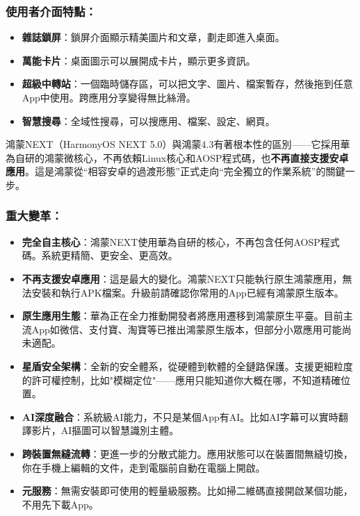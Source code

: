 \subsubsection*{使用者介面特點：}

\begin{itemize}
  \item \textbf{雜誌鎖屏}：鎖屏介面顯示精美圖片和文章，劃走即進入桌面。
  \item \textbf{萬能卡片}：桌面圖示可以展開成卡片，顯示更多資訊。
  \item \textbf{超級中轉站}：一個臨時儲存區，可以把文字、圖片、檔案暫存，然後拖到任意App中使用。跨應用分享變得無比絲滑。
  \item \textbf{智慧搜尋}：全域性搜尋，可以搜應用、檔案、設定、網頁。
\end{itemize}


鴻蒙NEXT（HarmonyOS NEXT 5.0）與鴻蒙4.3有著根本性的區別——它採用華為自研的鴻蒙微核心，不再依賴Linux核心和AOSP程式碼，也\textbf{不再直接支援安卓應用}。這是鴻蒙從“相容安卓的過渡形態”正式走向“完全獨立的作業系統”的關鍵一步。

\subsubsection*{重大變革：}

\begin{itemize}
  \item \textbf{完全自主核心}：鴻蒙NEXT使用華為自研的核心，不再包含任何AOSP程式碼。系統更精簡、更安全、更高效。
  \item \textbf{不再支援安卓應用}：這是最大的變化。鴻蒙NEXT只能執行原生鴻蒙應用，無法安裝和執行APK檔案。升級前請確認你常用的App已經有鴻蒙原生版本。
  \item \textbf{原生應用生態}：華為正在全力推動開發者將應用遷移到鴻蒙原生平臺。目前主流App如微信、支付寶、淘寶等已推出鴻蒙原生版本，但部分小眾應用可能尚未適配。
  \item \textbf{星盾安全架構}：全新的安全體系，從硬體到軟體的全鏈路保護。支援更細粒度的許可權控制，比如"模糊定位"——應用只能知道你大概在哪，不知道精確位置。
  \item \textbf{AI深度融合}：系統級AI能力，不只是某個App有AI。比如AI字幕可以實時翻譯影片，AI摳圖可以智慧識別主體。
  \item \textbf{跨裝置無縫流轉}：更進一步的分散式能力。應用狀態可以在裝置間無縫切換，你在手機上編輯的文件，走到電腦前自動在電腦上開啟。
  \item \textbf{元服務}：無需安裝即可使用的輕量級服務。比如掃二維碼直接開啟某個功能，不用先下載App。
\end{itemize}

